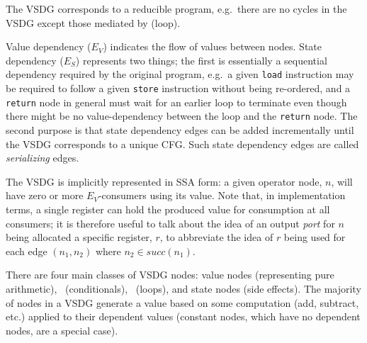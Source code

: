 {The VSDG corresponds to a reducible program, e.g.~there are no cycles in the VSDG except those mediated by \Tns (loop).

Value dependency ($E_V$) indicates the flow of values between nodes. 
State dependency ($E_S$) represents two things; 
the first is essentially a sequential dependency required by the original program, e.g.~a given \texttt{load} instruction may be required to follow a given \texttt{store} instruction without being re-ordered, and a \texttt{return} node in general must wait for an earlier loop to terminate even though there might be no value-dependency between the loop and the \texttt{return} node. 
The second purpose is that state dependency edges can be added incrementally until the VSDG corresponds to a unique CFG. 
Such state dependency edges are called {\em serializing} edges.

The VSDG is implicitly represented in SSA form: 
a given operator node, $n$, will have zero or more $E_V$-consumers using its value. 
Note that, in implementation terms, a single register can hold the produced value for consumption at all consumers; 
it is therefore useful to talk about the idea of an output {\em port} for $n$ being allocated a specific register, $r$, to abbreviate the idea of $r$ being used for each edge $(n_1,n_2)$ where $n_2 \in \textit{succ}(n_1)$.


There are four main classes of VSDG nodes: 
value nodes (representing pure arithmetic), \Gns\ (conditionals), \Tns\ (loops), and state nodes (side effects). 
The majority of nodes in a VSDG generate a value based on some computation (add, subtract, etc.) applied to their dependent values (constant nodes, which have no dependent nodes, are a special case).



}
